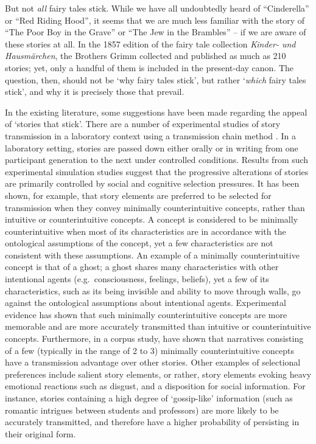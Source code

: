 But not \emph{all} fairy tales stick. While we have all undoubtedly heard of ``Cinderella'' or ``Red Riding Hood'', it seems that we are much less familiar with the story of ``The Poor Boy in the Grave'' or ``The Jew in the Brambles'' -- if we are aware of these stories at all. In the 1857 edition of the fairy tale collection \emph{Kinder- und Hausmärchen}, the Brothers Grimm collected and published as much as 210 stories; yet, only a handful of them is included in the present-day canon\autocite{zipes:2006,joosen:2014}. The question, then, should not be `why fairy tales stick', but rather `\emph{which} fairy tales stick', and why it is precisely those that prevail.

In the existing literature, some suggestions have been made regarding the appeal of `stories that stick'. There are a number of experimental studies of story transmission in a laboratory context using a transmission chain method \autocite{bartlett,Lyons:2006,mesoudiwhiten:2010,breithaupt:2015}. In a laboratory setting, stories are passed down either orally or in writing from one participant generation to the next under controlled conditions. Results from such experimental simulation studies suggest that the progressive alterations of stories are primarily controlled by social and cognitive selection pressures\autocite[See e.g.][]{owens:1979,diehl:2006,mesoudiwhiten:2008,eriksson:2012}. It has been shown, for example, that story elements are preferred to be selected for transmission when they convey minimally counterintuitive concepts, rather than intuitive or counterintuitive concepts\autocite{barrett:2004,Norenzayan:2006,Upal:2011}. A concept is considered to be minimally counterintuitive when most of its characteristics are in accordance with the ontological assumptions of the concept, yet a few characteristics are not consistent with these assumptions\autocite{Norenzayan:2004}. An example of a minimally counterintuitive concept is that of a ghost; a ghost shares many characteristics with other intentional agents (e.g.\ consciousness, feelings, beliefs), yet a few of its characteristics, such as its being invisible and ability to move through walls, go against the ontological assumptions about intentional agents. Experimental evidence has shown that such minimally counterintuitive concepts are more memorable and are more accurately transmitted than intuitive or counterintuitive concepts. Furthermore, in a corpus study, \citeauthor{Norenzayan:2006} have shown that narratives consisting of a few (typically in the range of 2 to 3) minimally counterintuitive concepts have a transmission advantage over other stories.\autocite{Norenzayan:2006} Other examples of selectional preferences include salient story elements, or rather, story elements evoking heavy emotional reactions such as disgust\autocite{eriksson:2014}, and a disposition for social information\autocite{reysen:2011,Stubbersfield:2014}. For instance, stories containing a high degree of `gossip-like' information (such as romantic intrigues between students and professors) are more likely to be accurately transmitted, and therefore have a higher probability of persisting in their original form\autocite{mesoudi:2006}.

